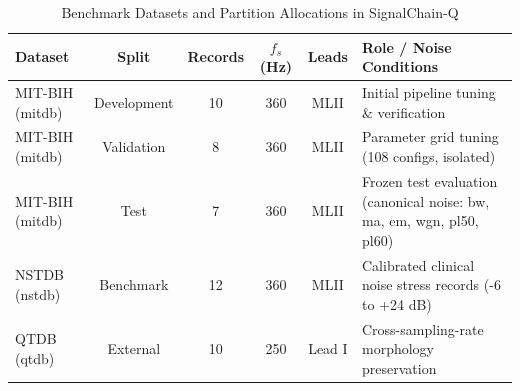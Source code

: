 \begin{table}[t]
\centering
\caption{Benchmark Datasets and Partition Allocations in SignalChain-Q}
\label{tab:datasets}
\begin{tabular}{lccccp{4.2cm}}
\hline
\textbf{Dataset} & \textbf{Split} & \textbf{Records} & \textbf{$f_s$ (Hz)} & \textbf{Leads} & \textbf{Role / Noise Conditions} \\
\hline
MIT-BIH (mitdb) & Development & 10 & 360 & MLII & Initial pipeline tuning \& verification \\
MIT-BIH (mitdb) & Validation  & 8  & 360 & MLII & Parameter grid tuning (108 configs, isolated) \\
MIT-BIH (mitdb) & Test        & 7  & 360 & MLII & Frozen test evaluation (canonical noise: bw, ma, em, wgn, pl50, pl60) \\
NSTDB (nstdb)   & Benchmark   & 12 & 360 & MLII & Calibrated clinical noise stress records (-6 to +24 dB) \\
QTDB (qtdb)     & External    & 10 & 250 & Lead I & Cross-sampling-rate morphology preservation \\
\hline
\end{tabular}
\end{table}
